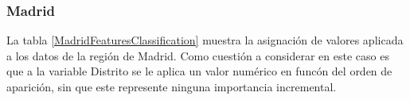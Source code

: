 \begin{table}[H]
\begin{center}
\begin{tabular}{|c|c|c|c|}
			\hline
			\hline
		\end{tabular}
	\end{center}

	\label{UKFeaturesClassification}
\end{table}


\subsubsection*{Madrid}

La tabla \ref{MadridFeaturesClassification} muestra la asignación de valores aplicada a los datos de la región de Madrid. Como cuestión a considerar en este caso es que a la variable Distrito se le aplica un valor numérico en funcón del orden de aparición, sin que este represente ninguna importancia incremental.

